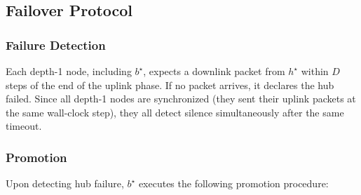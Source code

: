 \documentclass{article}
\begin{document}
\subsection{Failover Protocol}

\subsubsection{Failure Detection}
\label{sec:failure-detection}

Each depth-1 node, including $b^\star$, expects a downlink packet from $h^\star$ within
$D$ steps of the end of the uplink phase. If no packet arrives, it declares the hub
failed. Since all depth-1 nodes are synchronized (they sent their uplink packets at the
same wall-clock step), they all detect silence simultaneously after the same timeout.

\subsubsection{Promotion}
\label{sec:promotion}

Upon detecting hub failure, $b^\star$ executes the following promotion procedure:
\end{document}
